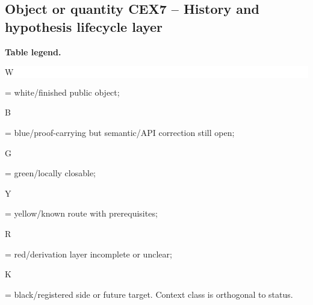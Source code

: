 \subsection*{Object or quantity CEX7 -- History and hypothesis lifecycle layer}
\hypertarget{objproof:CEX7}{}
\par\smallskip\noindent\begin{minipage}{0.99\linewidth}\footnotesize\raggedright\textbf{Table legend.} \colorbox{white}{\strut W} = white/finished public object; \colorbox{cyan!20}{\strut B} = blue/proof-carrying but semantic/API correction still open; \colorbox{green!18}{\strut G} = green/locally closable; \colorbox{yellow!25}{\strut Y} = yellow/known route with prerequisites; \colorbox{red!20}{\strut R} = red/derivation layer incomplete or unclear; \colorbox{black!18}{\strut K} = black/registered side or future target. Context class is orthogonal to status.\end{minipage}\par\vspace{0.25em}
